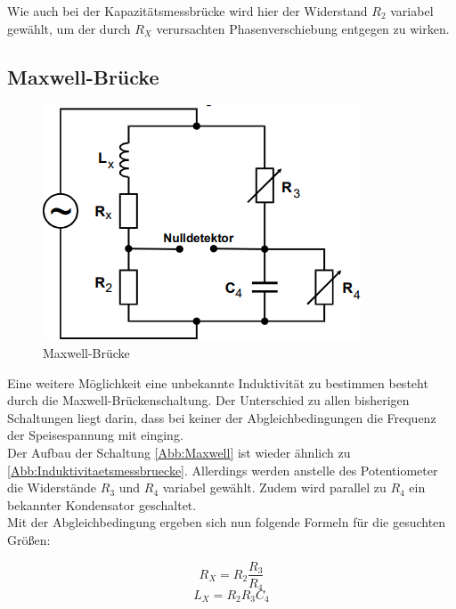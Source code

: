 \documentclass[
  bibliography=totoc,     %
  captions=tableheading,  %
  titlepage=firstiscover, %
]{scrartcl}
\begin{document}
  Wie auch bei der Kapazitätsmessbrücke wird hier der Widerstand $R_2$ variabel gewählt, um der durch $R_X$ verursachten 
  Phasenverschiebung entgegen zu wirken.

  \subsection{Maxwell-Brücke}

  \begin{figure}
    \centering
    \includegraphics{Maxwell.png}
    \caption{Maxwell-Brücke \cite{1}}
    \label{Abb:Maxwell}
  \end{figure}

  Eine weitere Möglichkeit eine unbekannte Induktivität zu bestimmen besteht durch die Maxwell-Brückenschaltung. Der Unterschied zu allen bisherigen Schaltungen liegt darin,
  dass bei keiner der Abgleichbedingungen die Frequenz der Speisespannung mit einging.\\
  Der Aufbau der Schaltung \autoref{Abb:Maxwell} ist wieder ähnlich zu \autoref{Abb:Induktivitaetsmessbruecke}. Allerdings werden anstelle des Potentiometer die Widerstände $R_3$ und $R_4$ variabel
  gewählt. Zudem wird parallel zu $R_4$ ein bekannter Kondensator geschaltet.\\
  Mit der Abgleichbedingung ergeben sich nun folgende Formeln für die gesuchten Größen:

  \begin{equation}
      R_X = R_2 \frac{R_3}{R_4} \label{eqn:LCRX}
  \end{equation}
  \begin{equation}
      L_X = R_2 R_3 C_4 \label{eqn:LLCX}
  \end{equation}
  \\
  \\
  \\
  \\
  
\end{document}
